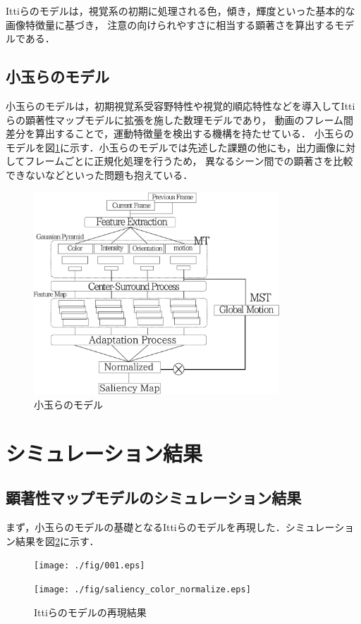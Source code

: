 Ittiらのモデルは，視覚系の初期に処理される色，傾き，輝度といった基本的な画像特徴量に基づき，
注意の向けられやすさに相当する顕著さを算出するモデルである．

\subsection{小玉らのモデル}
小玉らのモデルは，初期視覚系受容野特性や視覚的順応特性などを導入してIttiらの顕著性マップモデルに拡張を施した数理モデルであり，
動画のフレーム間差分を算出することで，運動特徴量を検出する機構を持たせている．
小玉らのモデルを図\ref{fig:kodama}に示す．小玉らのモデルでは先述した課題の他にも，出力画像に対してフレームごとに正規化処理を行うため，
異なるシーン間での顕著さを比較できないなどといった問題も抱えている．

\begin{figure}[h]
 \centering
 \includegraphics[keepaspectratio,width=92mm]{./fig/saliency_kodama_model.pdf}
 \centering
  \caption{小玉らのモデル}
 \label{fig:kodama}
\end{figure}
\vspace*{-6mm}

\section{シミュレーション結果}
\vspace{-3.2mm}
\subsection{顕著性マップモデルのシミュレーション結果}
まず，小玉らのモデルの基礎となるIttiらのモデルを再現した．シミュレーション結果を図\ref{fig:itti_saliency}に示す．
\vspace{-1.2mm}
\begin{figure}[h]
    \begin{minipage}[h]{0.5\hsize}
      \centering
      \texttt{[image: ./fig/001.eps]}
      \label{fig:input}
    \end{minipage}
    \begin{minipage}[h]{0.5\hsize}
      \centering
      \texttt{[image: ./fig/saliency\_color\_normalize.eps]}
      \label{fig:output}
    \end{minipage}
    \vspace{0.5mm}
    \caption{Ittiらのモデルの再現結果}
    \label{fig:itti_saliency}
\end{figure}


